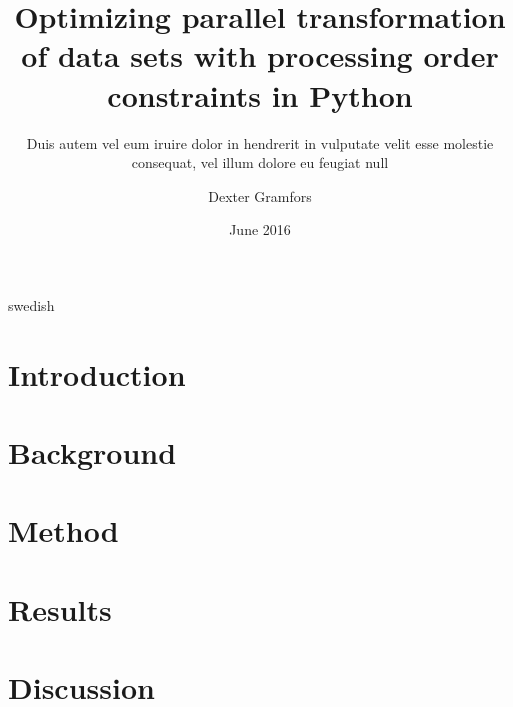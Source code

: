 \documentclass[a4paper,11pt]{kth-mag}
\title{Optimizing parallel transformation of data sets with processing order constraints in Python}
\subtitle{Duis autem vel eum iruire dolor in hendrerit in
          vulputate velit esse molestie consequat, vel illum
          dolore eu feugiat null}
\author{Dexter Gramfors}
\date{June 2016}
\begin{document}
\frontmatter
\pagestyle{empty}
\removepagenumbers
\maketitle
{}
\begin{abstract}
    
\end{abstract}
\clearpage
\begin{foreignabstract}{swedish}
    
\end{foreignabstract}
\clearpage
\tableofcontents*
\clearpage
\listoffigures
\mainmatter
\pagestyle{newchap}
\chapter{Introduction}
    
\chapter{Background}
    
\chapter{Method}
    
\chapter{Results}
    
\chapter{Discussion}
    
    
\nocite{*}
\printbibliography

\addappheadtotoc



\end{document}
